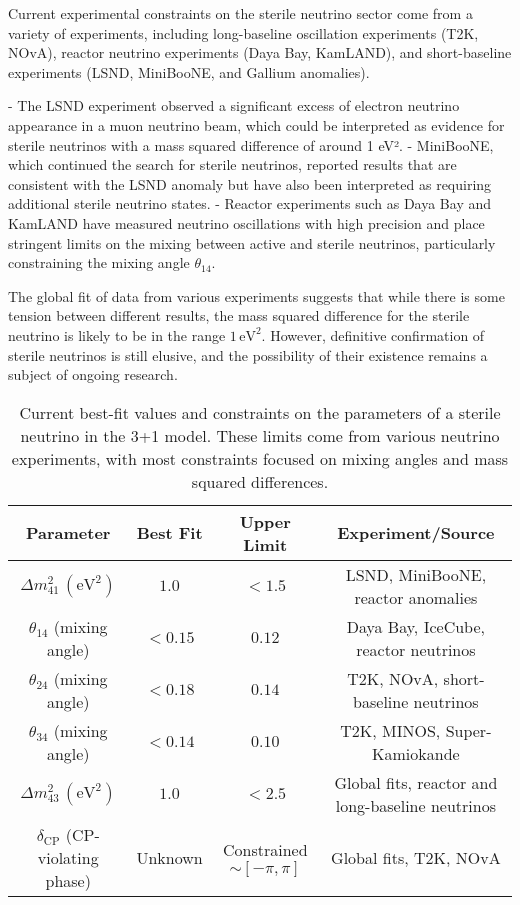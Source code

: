 \documentclass[a4paper,12pt,numbered]{article}
\begin{document}
Current experimental constraints on the sterile neutrino sector come from a variety of experiments, including long-baseline oscillation experiments (T2K, NOvA), reactor neutrino experiments (Daya Bay, KamLAND), and short-baseline experiments (LSND, MiniBooNE, and Gallium anomalies). 

- The LSND experiment observed a significant excess of electron neutrino appearance in a muon neutrino beam, which could be interpreted as evidence for sterile neutrinos with a mass squared difference of around 1 eV².
- MiniBooNE, which continued the search for sterile neutrinos, reported results that are consistent with the LSND anomaly but have also been interpreted as requiring additional sterile neutrino states.
- Reactor experiments such as Daya Bay and KamLAND have measured neutrino oscillations with high precision and place stringent limits on the mixing between active and sterile neutrinos, particularly constraining the mixing angle \( \theta_{14} \).

The global fit of data from various experiments suggests that while there is some tension between different results, the mass squared difference for the sterile neutrino is likely to be in the range \( 1 \, \text{eV}^2 \). However, definitive confirmation of sterile neutrinos is still elusive, and the possibility of their existence remains a subject of ongoing research.

\begin{table}[h!]
\centering
\begin{tabular}{|c|c|c|c|}
\hline
\textbf{Parameter} & \textbf{Best Fit} & \textbf{Upper Limit} & \textbf{Experiment/Source} \\
\hline
\(\Delta m^2_{41} \, (\text{eV}^2)\) & \(1.0 \) & \(< 1.5\) & LSND, MiniBooNE, reactor anomalies \cite{LSND, MiniBooNE} \\
\hline
\(\theta_{14}\) (mixing angle) & \( < 0.15 \) & \( 0.12 \) & Daya Bay, IceCube, reactor neutrinos \cite{DayaBay, IceCube} \\
\hline
\(\theta_{24}\) (mixing angle) & \( < 0.18 \) & \( 0.14 \) & T2K, NOvA, short-baseline neutrinos \cite{T2K, NOvA} \\
\hline
\(\theta_{34}\) (mixing angle) & \( < 0.14 \) & \( 0.10 \) & T2K, MINOS, Super-Kamiokande \cite{T2K, MINOS, SuperK} \\
\hline
\(\Delta m^2_{43} \, (\text{eV}^2)\) & \( 1.0 \) & \( < 2.5 \) & Global fits, reactor and long-baseline neutrinos \cite{Fogli_2012, DayaBay} \\
\hline
\(\delta_{\text{CP}}\) (CP-violating phase) & Unknown & Constrained \(\sim [-\pi, \pi]\) & Global fits, T2K, NOvA \cite{T2K_2023, NOvA} \\
\hline
\end{tabular}
\caption{Current best-fit values and constraints on the parameters of a sterile neutrino in the 3+1 model. These limits come from various neutrino experiments, with most constraints focused on mixing angles and mass squared differences.}
\label{tab:sterile_constraints}
\end{table}
\end{document}
